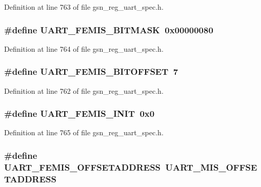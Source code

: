 Definition at line 763 of file gsn\_\-reg\_\-uart\_\-spec.h.

\hypertarget{a00575_a7642b1290bdd2632fdbde6dc23002af1}{
\subsubsection[{UART\_\-FEMIS\_\-BITMASK}]{\setlength{\rightskip}{0pt plus 5cm}\#define UART\_\-FEMIS\_\-BITMASK~0x00000080}}
\label{a00575_a7642b1290bdd2632fdbde6dc23002af1}


Definition at line 764 of file gsn\_\-reg\_\-uart\_\-spec.h.

\hypertarget{a00575_a7e2ff05f5be52dd4087cef4c9ff5ac48}{
\subsubsection[{UART\_\-FEMIS\_\-BITOFFSET}]{\setlength{\rightskip}{0pt plus 5cm}\#define UART\_\-FEMIS\_\-BITOFFSET~7}}
\label{a00575_a7e2ff05f5be52dd4087cef4c9ff5ac48}


Definition at line 762 of file gsn\_\-reg\_\-uart\_\-spec.h.

\hypertarget{a00575_ad43bde0afddf0023acefa3180b19cc21}{
\subsubsection[{UART\_\-FEMIS\_\-INIT}]{\setlength{\rightskip}{0pt plus 5cm}\#define UART\_\-FEMIS\_\-INIT~0x0}}
\label{a00575_ad43bde0afddf0023acefa3180b19cc21}


Definition at line 765 of file gsn\_\-reg\_\-uart\_\-spec.h.

\hypertarget{a00575_ae7f2f8c2886b803aa6ac65ae0313fe2f}{
\subsubsection[{UART\_\-FEMIS\_\-OFFSETADDRESS}]{\setlength{\rightskip}{0pt plus 5cm}\#define UART\_\-FEMIS\_\-OFFSETADDRESS~UART\_\-MIS\_\-OFFSETADDRESS}}
\label{a00575_ae7f2f8c2886b803aa6ac65ae0313fe2f}


